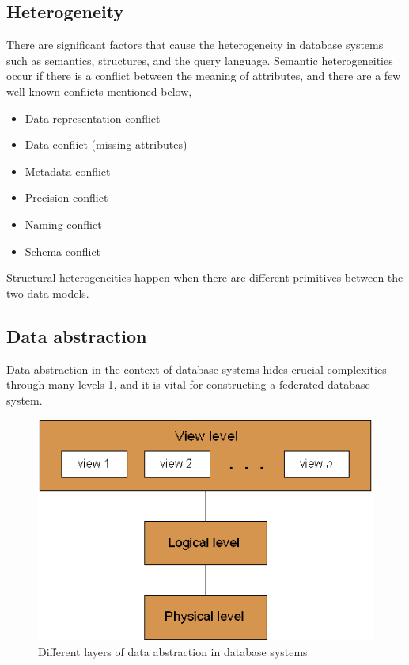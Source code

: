 	\subsection{Heterogeneity}
	There are significant factors that cause the heterogeneity in database systems such as semantics, structures, and the query language. Semantic heterogeneities occur if there is a conflict between the meaning of attributes, and there are a few well-known conflicts mentioned below,
	\begin{itemize}
		\item Data representation conflict
		\item Data conflict (missing attributes)
		\item Metadata conflict
		\item Precision conflict
		\item Naming conflict
		\item Schema conflict
	\end{itemize}
	
	Structural heterogeneities happen when there are different primitives between the two data models.
	
	\subsection{Data abstraction}
	Data abstraction in the context of database systems hides crucial complexities through many levels \ref{fig:Data_abstraction_levels}, and it is vital for constructing a federated database system.
	
	\begin{figure}[!htbp] 
		\begin{center}
			\includegraphics[scale=0.9]{./images/Data_abstraction_levels}	
			\caption{Different layers of data abstraction in database systems \cite{misc12}}	
			\label{fig:Data_abstraction_levels}	
		\end{center}
	\end{figure}
	
